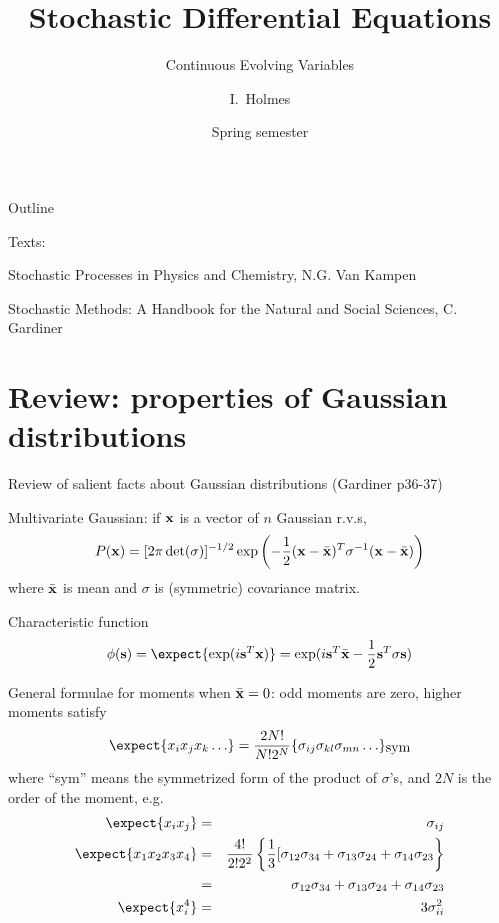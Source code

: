 \documentclass{beamer}
\title[SDEs] %
{Stochastic Differential Equations}
\subtitle
{Continuous Evolving Variables} %
\author%
{I.~Holmes} %
\institute[University of California, Berkeley] %
{
  Department of Bioengineering\\
  University of California, Berkeley}
\date%
{Spring semester}
\begin{document}
\begin{frame}
  \titlepage
\end{frame}

\begin{frame}{Outline}
  \tableofcontents
\end{frame}



\begin{frame}{}

  Texts:
  \itemb
\item Stochastic Processes in Physics and Chemistry, N.G. Van Kampen
\item Stochastic Methods: A Handbook for the Natural and Social Sciences, C. Gardiner
  \iteme
  
\end{frame}


\section{Review: properties of Gaussian distributions}

\begin{frame}{}

\itemb
 \item Review of salient facts about Gaussian distributions (Gardiner p36-37)
  \itemb
  \item Multivariate Gaussian: if ${\bf x}$ is a vector of $n$ Gaussian r.v.s,
\[
P({\bf x}) = [ 2\pi \det(\sigma) ]^{-1/2} \exp \left( -\frac{1}{2}({\bf x} - \bar{\bf x})^T \sigma^{-1} ({\bf x} - \bar{\bf x}) \right)
\]
where $\bar{\bf x}$ is mean and $\sigma$ is (symmetric) covariance matrix.
  \item Characteristic function
\[
\phi({\bf s}) = \expect{\exp(i {\bf s}^T {\bf x})} = \exp(i {\bf s}^T \bar{\bf x} - \frac{1}{2} {\bf s}^T \sigma {\bf s})
\]
\iteme

\iteme

\end{frame}


\begin{frame}{}
\itemb
  \item General formulae for moments when $\bar{\bf x}=0$: odd moments are zero, higher moments satisfy
\[
\expect{x_i x_j x_k \ldots} = \frac{2N!}{N! 2^N} \{ \sigma_{ij} \sigma_{kl} \sigma_{mn} \ldots \}_{\mbox{sym}}
\]
where ``sym'' means the symmetrized form of the product of $\sigma$'s, and $2N$ is the order of the moment, e.g.
\begin{eqnarray*}
\expect{x_i x_j} & = & \sigma_{ij} \\
\expect{x_1 x_2 x_3 x_4} & = & \frac{4!}{2! 2^2} \left\{ \frac{1}{3} [\sigma_{12}\sigma_{34} + \sigma_{13}\sigma_{24} + \sigma_{14}\sigma_{23}\right\} \\
& = & \sigma_{12}\sigma_{34} + \sigma_{13}\sigma_{24} + \sigma_{14}\sigma_{23} \\
\expect{x_i^4} & = & 3 \sigma^2_{ii}
\end{eqnarray*}
\iteme

\end{frame}
\end{document}
